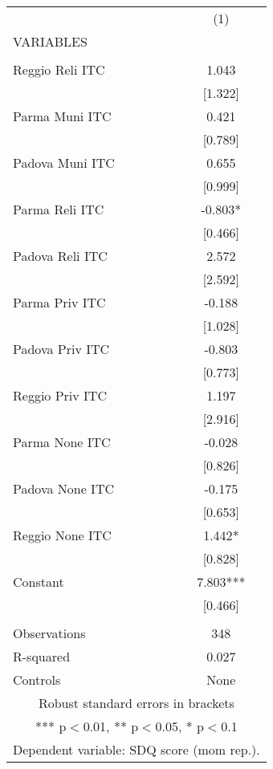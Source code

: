 \begin{tabular}{lc} \hline
 & (1) \\
VARIABLES &  \\ \hline
 &  \\
Reggio Reli ITC & 1.043 \\
 & [1.322] \\
Parma Muni ITC & 0.421 \\
 & [0.789] \\
Padova Muni ITC & 0.655 \\
 & [0.999] \\
Parma Reli ITC & -0.803* \\
 & [0.466] \\
Padova Reli ITC & 2.572 \\
 & [2.592] \\
Parma Priv ITC & -0.188 \\
 & [1.028] \\
Padova Priv ITC & -0.803 \\
 & [0.773] \\
Reggio Priv ITC & 1.197 \\
 & [2.916] \\
Parma None ITC & -0.028 \\
 & [0.826] \\
Padova None ITC & -0.175 \\
 & [0.653] \\
Reggio None ITC & 1.442* \\
 & [0.828] \\
Constant & 7.803*** \\
 & [0.466] \\
 &  \\
Observations & 348 \\
R-squared & 0.027 \\
 Controls & None \\ \hline
\multicolumn{2}{c}{ Robust standard errors in brackets} \\
\multicolumn{2}{c}{ *** p$<$0.01, ** p$<$0.05, * p$<$0.1} \\
\multicolumn{2}{c}{ Dependent variable: SDQ score (mom rep.).} \\
\end{tabular}
